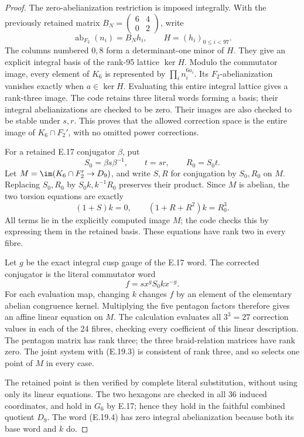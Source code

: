 \begin{proof}
The zero-abelianization restriction is imposed
integrally. With the previously retained matrix
$B_N=\left(\begin{smallmatrix}6&4\\0&2\end{smallmatrix}\right)$,
write
\[
       \operatorname{ab}_{F_2}(n_i)=B_N h_i,
       \qquad H=(h_i)_{0\leq i<97}.
\]
The columns numbered $0,8$ form a determinant-one
minor of $H$. They give an explicit integral
basis of the rank-95 lattice $\ker H$.
Modulo the commutator image, every element of
$K_6$ is represented by $\prod_i n_i^{6a_i}$.
Its $F_2$-abelianization vanishes exactly when
$a\in\ker H$. Evaluating this entire integral
lattice gives a rank-three image. The code
retains three literal words forming a basis;
their integral abelianizations are checked
to be zero. Their images are also checked
to be stable under $s,r$. This proves that
the allowed correction space is the entire
image of $K_6\cap F_2'$, with no omitted
power corrections.

For a retained E.17 conjugator $\beta$, put
\[
 S_0=\beta s\beta^{-1},\qquad
 t=sr,\qquad R_0=S_0t.
\]
Let $M=\im(K_6\cap F_2'\to D_9)$, and write
$S,R$ for conjugation by $S_0,R_0$ on $M$.
Replacing $S_0,R_0$ by $S_0k,k^{-1}R_0$ preserves
their product. Since $M$ is abelian, the two
torsion equations are exactly
\[
       (1+S)k=0,\qquad
       (1+R+R^2)k=R_0^3.
 \tag{E.19.3}
\]
All terms lie in the explicitly computed image
$M$; the code checks this by expressing them in
the retained basis. These equations have rank
two in every fibre.

Let $g$ be the exact integral cusp gauge of
the E.17 word. The corrected conjugator is
the literal commutator word
\[
          f=sx^gS_0k x^{-g}.
 \tag{E.19.4}
\]
For each evaluation map, changing $k$ changes
$f$ by an element of the elementary abelian
congruence kernel. Multiplying the five
pentagon factors therefore gives an affine
linear equation on $M$. The calculation
evaluates all $3^3=27$ correction values in
each of the 24 fibres, checking every
coefficient of this linear description.
The pentagon matrix has rank three; the
three braid-relation matrices have rank
zero. The joint system with (E.19.3) is
consistent of rank three, and so selects
one point of $M$ in every case.

The retained point is then verified by
complete literal substitution, without
using only its linear equations. The two
hexagons are checked in all 36 induced
coordinates, and hold in $G_6$ by E.17;
hence they hold in the faithful combined
quotient $D_9$. The word (E.19.4) has zero
integral abelianization because both its
base word and $k$ do.


\end{proof}
